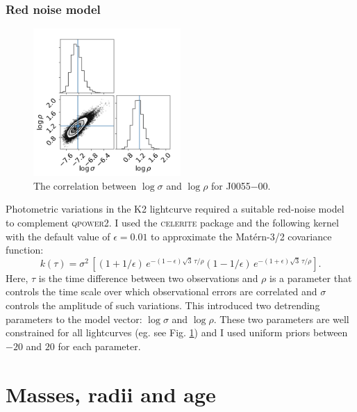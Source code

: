 \subsubsection{Red noise model}\label{methods:rednoise}

\begin{figure}
    \centering
    \includegraphics[width=0.5\textwidth]{7-images/220196587_GP_parameters.png}
    \caption{The correlation between $\log \sigma$ and $\log \rho$ for J0055$-$00.}
    \label{method:fig:celerite_corrolation}
\end{figure}

Photometric variations in the K2 lightcurve required a suitable red-noise model to complement \textsc{qpower2}. I used the \textsc{celerite} package \citep{2017AJ....154..220F} and the following kernel with the default value of $\epsilon=0.01$ to approximate the Mat\'{e}rn-3/2 covariance function: 
%
\[ k(\tau) = \sigma^2\,\left[
  \left(1+1/\epsilon\right)\,e^{-(1-\epsilon)\sqrt{3}\,\tau/\rho}
  \left(1-1/\epsilon\right)\,e^{-(1+\epsilon)\sqrt{3}\,\tau/\rho} \right]. \]
%
 Here, $\tau$ is the time difference between two observations and $\rho$ is a parameter that controls the time scale over which observational errors are correlated and $\sigma$ controls the amplitude of such variations. This introduced two detrending parameters to the model vector: $\log \sigma$ and $\log \rho$.  These two parameters are well constrained for all lightcurves (eg. see Fig. \ref{method:fig:celerite_corrolation}) and I used uniform priors between $-20$ and $20$ for each parameter.



\section{Masses, radii and age}\label{methods:eblmmass}

